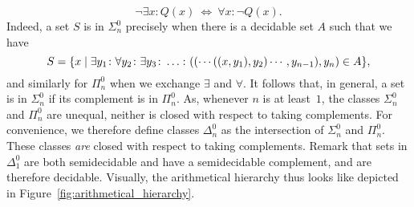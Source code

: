 \begin{equation*}
  \lnot \exists x\colon Q(x) \:\iff\: \forall x\colon \lnot Q(x).
\end{equation*}
Indeed, a set $S$ is in $\Sigma^0_n$ precisely when there is a decidable set $A$ such that we have
\begin{equation}
\label{eq:arithmetical_hierarchy}
  S = \{x \;|\; \exists y_1\colon \forall y_2\colon\exists y_3\colon \ldots\colon ((\cdots((x, y_1), y_2)\cdots, y_{n-1}), y_n) \in A\},
\end{equation}
and similarly for $\Pi^0_n$ when we exchange $\exists$ and $\forall$.
It follows that, in general, a set is in $\Sigma^0_n$ if its complement is in $\Pi^0_n$.
As, whenever $n$ is at least~$1$, the classes $\Sigma^0_n$ and $\Pi^0_n$ are unequal, neither is closed with respect to taking complements.
For convenience, we therefore define classes $\Delta^0_n$ as the intersection of $\Sigma^0_n$ and $\Pi^0_n$.
These classes \emph{are} closed with respect to taking complements.
Remark that sets in $\Delta^0_1$ are both semidecidable and have a semidecidable complement, and are therefore decidable.
Visually, the arithmetical hierarchy thus looks like depicted in Figure~\ref{fig:arithmetical_hierarchy}.
